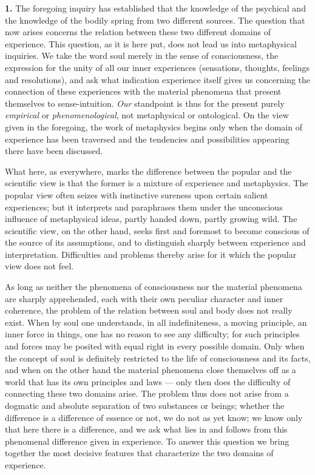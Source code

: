 \documentclass[12pt,a4paper]{book}
\newcommand{\opage}[1]{\marginnote{\footnotesize\textit{[#1]}}}
\begin{document}
\noindent\textbf{1.} The foregoing inquiry has established that the
knowledge of the psychical and the knowledge of the bodily spring from
two different sources. The question that now arises concerns the
relation between these two different domains of experience. This
question, as it is here put, does not lead us into metaphysical
inquiries. We take the word soul merely in the sense of consciousness,
the expression for the unity of all our inner experiences (sensations,
thoughts, feelings and resolutions), and ask what indication experience
itself gives us concerning the connection of these experiences with the
material phenomena that present themselves to sense-intuition.
\emph{Our} standpoint is thus for the present purely \emph{empirical} or
\emph{phenomenological}, not metaphysical or ontological. On the view
given in the foregoing, the work of metaphysics begins only when the
domain of experience has been traversed and the tendencies and
possibilities appearing there have been discussed.

What here, as everywhere, marks the difference between the popular and
the scientific view is that the former is a mixture of experience and
metaphysics. The popular view often seizes with instinctive sureness
upon certain salient experiences; but it interprets and paraphrases
them under the unconscious influence of metaphysical ideas, partly
handed down, partly growing wild. The scientific view, on the other
hand, seeks first and foremost to become conscious of the source of its
assumptions, and to distinguish sharply between experience and
interpretation. Difficulties and problems thereby arise for it which the
popular view does not feel.


\opage{37}As long as neither the phenomena of consciousness nor the
material phenomena are sharply apprehended, each with their own
peculiar character and inner coherence, the problem of the relation
between soul and body does not really exist. When by soul one
understands, in all indefiniteness, a moving principle, an inner force
in things, one has no reason to see any difficulty; for such principles
and forces may be posited with equal right in every possible domain.
Only when the concept of soul is definitely restricted to the life of
consciousness and its facts, and when on the other hand the material
phenomena close themselves off as a world that has its own principles
and laws --- only then does the difficulty of connecting these two
domains arise. The problem thus does not arise from a dogmatic and
absolute separation of two substances or beings; whether the difference
is a difference of essence or not, we do not as yet know; we know only
that here there is a difference, and we ask what lies in and follows
from this phenomenal difference given in experience. To answer this
question we bring together the most decisive features that characterize
the two domains of experience.
\end{document}
